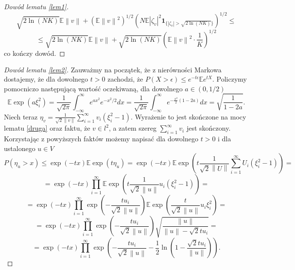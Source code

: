 \documentclass{mwart}
\newcommand{\norm}[1]{\left\lVert#1\right\rVert}
\begin{document}
\begin{proof} [Dowód lematu \ref{lem1}]
\begin{displaymath}
\sqrt{2\ln (NK)}\mathbb{E}\norm{v}+\left(\mathbb{E}\norm{v}^2\right)^{1/2}\left(N\mathbb{E}|\zeta_v|^2\pmb{1}_{\{|\zeta_v|> \sqrt{2\ln (NK)}\}}\right)^{1/2}\leq
\end{displaymath}
\begin{displaymath}
\leq \sqrt{2\ln (NK)}\mathbb{E}\norm{v}+\sqrt{2\ln (NK)}\left(\mathbb{E}\norm{v}^2\cdot \frac{1}{K}\right)^{1/2}
\end{displaymath}
co kończy dowód.
\end{proof}


\begin{proof}[Dowód lematu \ref{lem2}]
Zauważmy na początek, że z nierówności Markowa dostajemy, że dla dowolnego $t>0$ zachodzi, że $P(X>\epsilon)\leq e^{-t\epsilon}\mathbb{E}e^{tX}$. Policzymy pomocniczo następującą wartość oczekiwaną, dla dowolnego $a\in (0,1/2)$
\begin{displaymath}
\mathbb{E}\exp (a\xi_i^2)=\frac{1}{\sqrt{2\pi}}\int_{-\infty}^{\infty}e^{ax^2}e^{-x^2/2}dx=\frac{1}{\sqrt{2\pi}}\int_{-\infty}^{\infty}e^{-\frac{x^2}{2}(1-2a)}dx=\sqrt{\frac{1}{1-2a}}.
\end{displaymath}
Niech teraz $\eta_v=\frac{1}{\sqrt{2}\norm{v}}\sum_{i=1}^{\infty}v_i(\xi_i^2-1)$. Wyrażenie to jest skończone na mocy lematu \ref{druga} oraz  faktu, że $v\in l^2$, a zatem szereg $\sum_{i=1}^{\infty}v_i$ jest skończony.  Korzystając z powyższych faktów możemy napisać dla dowolnego $t>0$ i dla ustalonego $u\in V$
\begin{displaymath}
P(\eta_u>x)\leq \exp(-tx)\mathbb{E}\exp(t\eta_u)=\exp(-tx)\mathbb{E}\exp\left(t\frac{1}{\sqrt{2}\norm{U}}\sum_{i=1}^{\infty}U_i(\xi_i^2-1)\right)=
\end{displaymath}
\begin{displaymath}
=\exp(-tx)\prod_{i=1}^{\infty}\mathbb{E}\exp\left(t\frac{1}{\sqrt{2}\norm{u}}u_i(\xi_i^2-1)\right)=
\end{displaymath}
\begin{displaymath}
=\exp(-tx)\prod_{i=1}^{\infty}\exp\left(-\frac{tu_i}{\sqrt{2}\norm{u}}\right)\mathbb{E}\exp\left(\frac{t}{\sqrt{2}\norm{u}}u_i\xi_i^2\right)=
\end{displaymath}
\begin{displaymath}
=\exp(-tx)\prod_{i=1}^{\infty}\exp\left(-\frac{tu_i}{\sqrt{2}\norm{u}}\right)\sqrt{\frac{\norm{u}}{\norm{u}-\sqrt{2}tu_i}}=
\end{displaymath}
\begin{displaymath}
=\exp(-tx)\prod_{i=1}^{\infty}\exp\left(-\frac{tu_i}{\sqrt{2}\norm{u}}-\frac{1}{2}\ln\left(1-\frac{\sqrt{2}tu_i}{\norm{u}}\right)\right).

\end{displaymath}
\end{proof}
\end{document}
